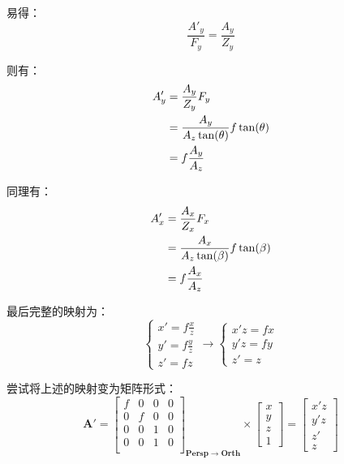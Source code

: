\documentclass[12pt,oneside,a4paper]{ctexart}
\begin{document}
易得：
\begin{equation*}
	\frac{A'_y}{F_y}=\frac{A_y}{Z_y}
\end{equation*}

则有：
\begin{align}
	A'_y & =\frac{A_y}{Z_y}F_y                          \notag \\
	     & =\frac{A_y}{ A_z \tan(\theta)}f \tan(\theta) \notag \\
	     & =f\frac{A_y}{ A_z }\notag
\end{align}

同理有：
\begin{align}
	A'_x & =\frac{A_x}{Z_x}F_x                          \notag \\
	     & =\frac{A_x}{ A_z \tan(\beta)}f \tan(\beta) \notag   \\
	     & =f\frac{A_x}{ A_z }\notag
\end{align}

最后完整的映射为：
\begin{equation*}
	\left\{
	\begin{array}{lr}
		x' = f \frac{x}{z} \\
		y' = f \frac{y}{z} \\
		z' = f z
	\end{array}
	\right.
	\rightarrow
	\left\{
	\begin{array}{lr}
		x'z = f x \\
		y'z = f y \\
		z'=  z
	\end{array}
	\right.
\end{equation*}

尝试将上述的映射变为矩阵形式：
\begin{equation}
	\mathbf{A'} =
	\begin{bmatrix}
		f & 0 & 0 & 0 \\
		0 & f & 0 & 0 \\
		0 & 0 & 1 & 0 \\
		0 & 0 & 1 & 0 \\
	\end{bmatrix}_{\mathbf{Persp}\rightarrow\mathbf{Orth}}
	\times
	\begin{bmatrix}
		x \\
		y \\
		z \\
		1
	\end{bmatrix}
	=\begin{bmatrix}
		x'z \\
		y'z \\
		z'  \\
		z
	\end{bmatrix}
	\label{PersptoOrth}
\end{equation}
\end{document}
